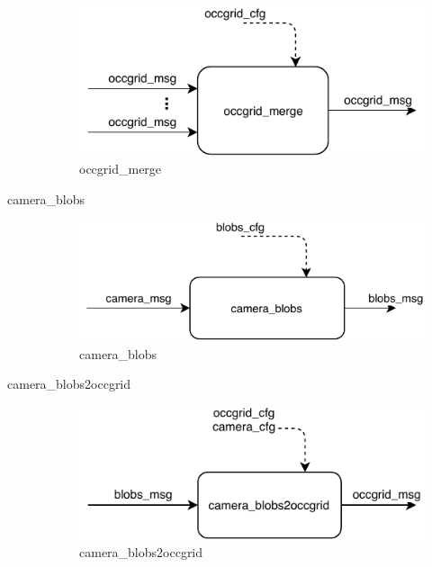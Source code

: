 \begin{description}
\begin{figure}[ht!]
\centering
\includegraphics[scale=1]{fig/3/occgrid_merge.pdf}
\caption{occgrid\_merge}
\label{occgrid_merge}
\end{figure}

\item[camera\_blobs] \hfill

\begin{figure}[ht!]
\centering
\includegraphics[scale=1]{fig/3/camera_blobs.pdf}
\caption{camera\_blobs}
\label{camera_blobs}
\end{figure}

\item[camera\_blobs2occgrid] \hfill

\begin{figure}[ht!]
\centering
\includegraphics[scale=1]{fig/3/camera_blobs2occgrid.pdf}
\caption{camera\_blobs2occgrid}
\label{camera_blobs2occgrid}
\end{figure}

\end{description}

